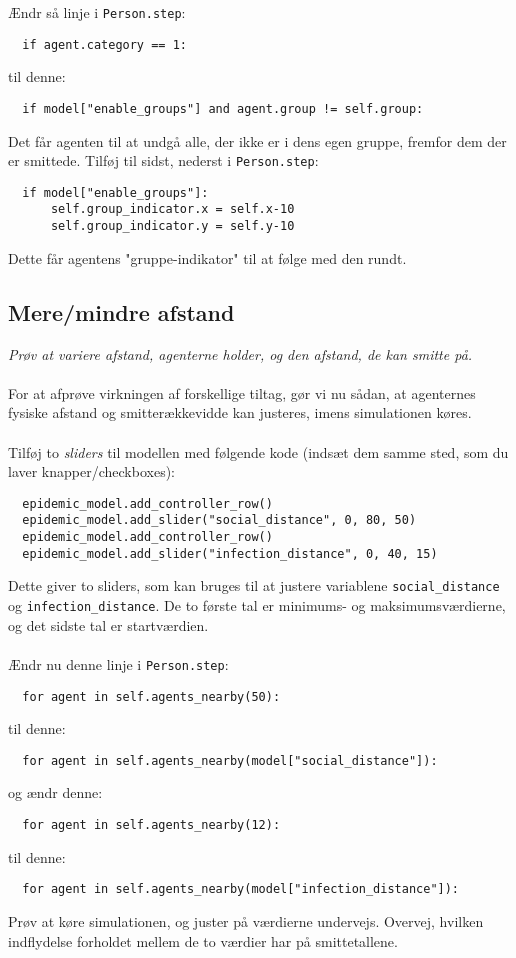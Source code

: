 \documentclass{article}
\begin{document}
Ændr så linje i \texttt{Person.step}:
\begin{lstlisting}
  if agent.category == 1:
\end{lstlisting}
til denne:
\begin{lstlisting}
  if model["enable_groups"] and agent.group != self.group:
\end{lstlisting}
Det får agenten til at undgå alle, der ikke er i dens egen gruppe, fremfor dem der er smittede.
Tilføj til sidst, nederst i \texttt{Person.step}:
\begin{lstlisting}
  if model["enable_groups"]:
      self.group_indicator.x = self.x-10
      self.group_indicator.y = self.y-10
\end{lstlisting}
Dette får agentens "gruppe-indikator" til at følge med den rundt.

\subsection{Mere/mindre afstand}
\textit{Prøv at variere afstand, agenterne holder, og den afstand, de kan smitte på.}\\\\
For at afprøve virkningen af forskellige tiltag, gør vi nu sådan, at agenternes fysiske afstand og smitterækkevidde kan justeres, imens simulationen køres.\\\\
Tilføj to \textit{sliders} til modellen med følgende kode (indsæt dem samme sted, som du laver knapper/checkboxes):
\begin{lstlisting}
  epidemic_model.add_controller_row()
  epidemic_model.add_slider("social_distance", 0, 80, 50)
  epidemic_model.add_controller_row()
  epidemic_model.add_slider("infection_distance", 0, 40, 15)
\end{lstlisting}
Dette giver to sliders, som kan bruges til at justere variablene \texttt{social\_distance} og \texttt{infection\_distance}. De to første tal er minimums- og maksimumsværdierne, og det sidste tal er startværdien.\\\\
Ændr nu denne linje i \texttt{Person.step}:
\begin{lstlisting}
  for agent in self.agents_nearby(50):
\end{lstlisting}
til denne:
\begin{lstlisting}
  for agent in self.agents_nearby(model["social_distance"]):
\end{lstlisting}
og ændr denne:
\begin{lstlisting}
  for agent in self.agents_nearby(12):
\end{lstlisting}
til denne:
\begin{lstlisting}
  for agent in self.agents_nearby(model["infection_distance"]):
\end{lstlisting}
Prøv at køre simulationen, og juster på værdierne undervejs. Overvej, hvilken indflydelse forholdet mellem de to værdier har på smittetallene.
\end{document}
